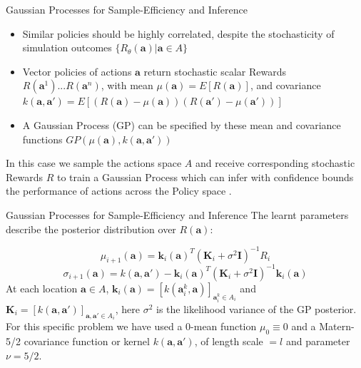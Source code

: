 \documentclass{beamer}
\begin{document}
\begin{frame}{Gaussian Processes for Sample-Efficiency and Inference}

\begin{itemize}
\item Similar policies should be highly correlated, despite the stochasticity of simulation outcomes  $\{R_\theta(\bm{a})| \bm{a}\in A \}$
\item Vector policies of actions $\bm{a}$ return stochastic scalar Rewards $R(\bm{a}^{1})...R(\bm{a}^{n})$, with mean $\mu(\bm{a}) = E[R(\bm{a})] $, and covariance $ k(\bm{a},\bm{a}')=E[(R(\bm{a})-\mu(\bm{a}))(R(\bm{a}')-\mu(\bm{a}'))]$
\item A Gaussian Process (GP) can be specified by these mean and covariance functions $GP(\mu(\bm{a}),k(\bm{a},\bm{a}'))$


\end{itemize}

In this case we sample the actions space $A$ and receive corresponding stochastic Rewards $R$ to train a Gaussian Process which can infer with confidence bounds the performance of actions across the Policy space \cite{Williams1996}.  



\end{frame}

\begin{frame}{Gaussian Processes for Sample-Efficiency and Inference}
The learnt parameters describe the posterior distribution over $R(\bm{a})$:

\begin{equation}
\mu_{i+1}(\bm{a}) = \bm{k}_i(\bm{a})^{T}(\bm{K}_{i}+\sigma^2\bm{I})^{-1}R_i
\end{equation}
\begin{equation}
\sigma_{i+1}(\bm{a}) = k(\bm{a},\bm{a}') - \bm{k}_i(\bm{a})^{T}(\bm{K}_{i}+\sigma^2\bm{I})^{-1}\bm{k}_i(\bm{a})
\end{equation}
At each location $\bm{a} \in A$,  $\bm{k}_i(\bm{a})=[k(\bm{a}_i^k,\bm{a})]_{\bm{a}_i^k\in A_i}$ and $\bm{K}_i = [k(\bm{a},\bm{a}')]_{\bm{a},\bm{a}'\in A_i}$, here $\sigma^2$ is the likelihood variance of the GP posterior. For this specific problem we have used a 0-mean function $\mu_0 \equiv 0$ and a Matern-5/2 covariance function or kernel $k(\bm{a},\bm{a}')$, of length scale $=l$ and parameter $\nu = 5/2$.


\end{frame}
\end{document}

